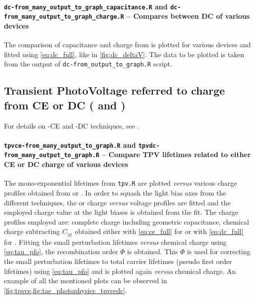 		\paragraph{\texttt{dc-from\_many\_output\_to\_graph\_capacitance.R} and \texttt{dc-\-from\_many\_output\_to\_graph\_charge.R} -- Compares between DC of various devices}
		The comparison of capacitance and charge from  is plotted for various devices and fitted using \cref{eq:dc_full}, like in \cref{fig:dc_deltaV}.
		The data to be plotted is taken from the output of \texttt{dc-\-from\_output\_to\_graph.R} script.

	\subsection{Transient PhotoVoltage referred to charge from CE or DC ( and )}\label{r_tpvcedc}
		For details on -CE and -DC techniques, see .

		\paragraph{\texttt{tpvce-\-from\_many\_output\_to\_graph.R} and \texttt{tpvdc-\-from\_many\_output\_to\_graph.R} -- Compare TPV lifetimes related to either CE or DC charge of various devices}
		The mono\hyp{}exponential lifetimes from \texttt{tpv.R} are plotted \textsl{versus} various charge profiles obtained from  or .
		In order to squash the light bias axes from the different techniques, the  or  charge \textsl{versus} voltage profiles are fitted and the employed charge value at the  light biases is obtained from the fit.
		The charge profiles employed are: complete charge including geometric capacitance, chemical charge subtracting $C_|g|$ obtained either with \cref{eq:ce_full} for  or with \cref{eq:dc_full} for .
		Fitting the small perturbation lifetimes \textsl{versus} chemical charge using \cref{eq:tau_pfo}, the recombination order $\Phi$ is obtained.
		This $\Phi$ is used for correcting the small perturbation lifetimes to total carrier lifetimes (pseudo first order lifetimes) using \cref{eq:tau_pfo} and is plotted again \textsl{versus} chemical charge.
		An example of all the mentioned plots can be observed in \cref{fig:tpvce,fig:tae_photophysics_tpvcedc}.

